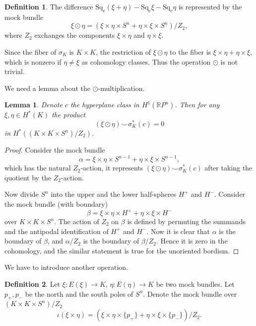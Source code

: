 \documentclass[12pt,a4paper]{amsart}
\newtheorem{lem}{Lemma}
\theoremstyle{definition}
\newtheorem{defn}{Definition}
\theoremstyle{remark}
\begin{document}
\begin{defn}
The difference $\operatorname{Sq_e}(\xi+\eta) - \operatorname{Sq_e}\xi - \operatorname{Sq_e}\eta$ is represented by the mock bundle
$$
\xi \odot \eta = (\xi\times\eta\times S^n + \eta\times\xi\times S^n)/Z_2,
$$
where $Z_2$ exchanges the components $\xi\times\eta$ and $\eta\times\xi$. 
\end{defn}

Since the fiber of $\sigma_K$ is $K\times K$, the restriction of $\xi\odot \eta$ to the fiber is $\xi\times\eta+\eta\times\xi$, which is nonzero if $\eta\not=\xi$ as cohomology classes. Thus the operation $\odot$ is not trivial.

We need a lemma about the $\odot$-multiplication.

\begin{lem}
\label{odot-ann}
Denote $c$ the hyperplane class in $H^1(\mathbb RP^n)$. Then for any $\xi,\eta\in H^*(K)$ the product 
$$
(\xi\odot\eta)\smile\sigma_K^*(c) = 0
$$
in $H^*((K\times K\times S^n)/Z_2)$.
\end{lem}

\begin{proof}
Consider the mock bundle 
$$
\alpha = \xi\times\eta\times S^{n-1} + \eta\times\xi\times S^{n-1},
$$
which has the natural $Z_2$-action, it represents $(\xi\odot\eta)\smile\sigma_K^*(c)$ after taking the quotient by the $Z_2$-action.

Now divide $S^n$ into the upper and the lower half-spheres $H^+$ and $H^-$. Consider the mock bundle (with boundary) 
$$
\beta = \xi\times\eta\times H^+ + \eta\times\xi\times H^-
$$
over $K\times K\times S^n$. The action of $Z_2$ on $\beta$ is defined by permuting the summands and the antipodal identification of $H^+$ and $H^-$. Now it is clear that $\alpha$ is the boundary of $\beta$, and $\alpha/Z_2$ is the boundary of $\beta/Z_2$. Hence it is zero in the cohomology, and the similar statement is true for the unoriented bordism.
\end{proof}

We have to introduce another operation.

\begin{defn}
Let $\xi :E(\xi)\to K$, $\eta : E(\eta)\to K$ be two mock bundles. Let $p_+,p_-$ be the north and the south poles of $S^n$. Denote the mock bundle over $(K\times K\times S^n)/Z_2$
$$
\iota(\xi\times\eta) = (\xi\times\eta\times\{p_+\} + \eta\times\xi\times\{p_-\})/Z_2.
$$
\end{defn}
\end{document}
